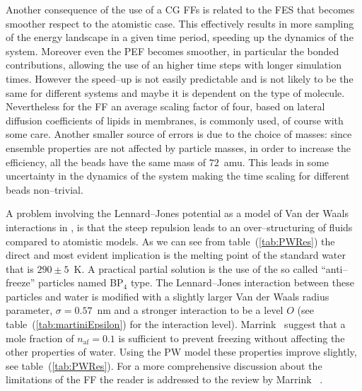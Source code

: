 Another consequence of the use of a \ac{CG} \acp{FF} is related to the \ac{FES} that becomes smoother respect to 
the atomistic case. This effectively results in more sampling of the energy landscape in a given time period, 
speeding up the dynamics of the system. Moreover even the \ac{PEF} becomes smoother, in particular the bonded 
contributions, allowing the use of an higher time steps with longer simulation times. However the speed--up is 
not easily predictable and is not likely to be the same for different systems and maybe it is dependent on the 
type of molecule. Nevertheless for the \martini \ac{FF} an average scaling factor of four, based on lateral 
diffusion coefficients of lipids in membranes, is commonly used, of course with some care. Another smaller source 
of errors is due to the choice of masses: since ensemble properties are not affected by particle masses, in order 
to increase the efficiency, all the \martini beads have the same mass of $72$~amu. This leads in some uncertainty 
in the dynamics of the system making the time scaling for different beads non--trivial.

A problem involving the Lennard--Jones potential as a model of Van der Waals interactions in \martini, is that 
the steep repulsion leads to an over--structuring of fluids compared to atomistic models. As we can see from 
table~(\ref{tab:PWRes}) the direct and most evident implication is the melting point of the standard \martini 
water that is $290 \pm 5$~K. A practical partial solution is the use of the so called ``anti--freeze'' particles 
named BP$_4$ type. The Lennard--Jones interaction between these particles and water is modified with a slightly 
larger Van der Waals radius parameter, $\sigma = 0.57$~nm and a stronger interaction to be a level $O$ (see 
table~(\ref{tab:martiniEpsilon}) for the interaction level). Marrink \etal\, suggest that a mole fraction of 
$n_{\text{af}} = 0.1$ is sufficient to prevent freezing without affecting the other properties of water. 
Using the \ac{PW} model these properties improve slightly, see table~(\ref{tab:PWRes}). For a more comprehensive 
discussion about the limitations of the \martini \ac{FF} the reader is addressed to the review by Marrink \etal\, \cite{MartiniReview}.


